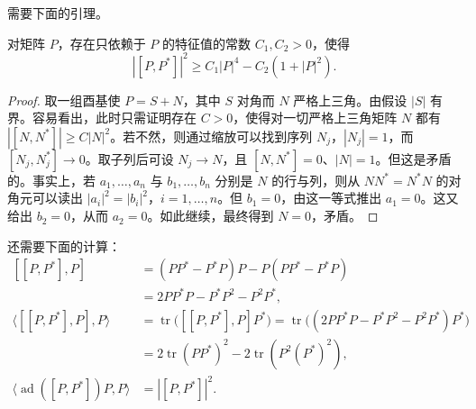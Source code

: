 需要下面的引理。

\begin{lemma}[参看 {[59, p. 27]}]
对矩阵 $P$，存在只依赖于 $P$ 的特征值的常数 $C_1,C_2>0$，使得
\[
|[P,P^*]|^2\ge C_1|P|^4-C_2(1+|P|^2).
\]
\end{lemma}

\begin{proof}
取一组酉基使 $P=S+N$，其中 $S$ 对角而 $N$ 严格上三角。由假设 $|S|$ 有界。容易看出，此时只需证明存在 $C>0$，使得对一切严格上三角矩阵 $N$ 都有 $|[N,N^*]|\ge C|N|^2$。若不然，则通过缩放可以找到序列 $N_j$，$|N_j|=1$，而 $[N_j,N_j^*]\to0$。取子列后可设 $N_j\to N$，且 $[N,N^*]=0$、$|N|=1$。但这是矛盾的。事实上，若 $a_1,\dots,a_n$ 与 $b_1,\dots,b_n$ 分别是 $N$ 的行与列，则从 $NN^*=N^*N$ 的对角元可以读出 $|a_i|^2=|b_i|^2$，$i=1,\dots,n$。但 $b_1=0$，由这一等式推出 $a_1=0$。这又给出 $b_2=0$，从而 $a_2=0$。如此继续，最终得到 $N=0$，矛盾。
\end{proof}

还需要下面的计算：
\begin{equation}
\begin{aligned}
[[P,P^*],P]&=(PP^*-P^*P)P-P(PP^*-P^*P)\\
&=2PP^*P-P^*P^2-P^2P^*,\\
\langle[[P,P^*],P],P\rangle&=\operatorname{tr}\bigl([[P,P^*],P]P^*\bigr)=\operatorname{tr}\bigl((2PP^*P-P^*P^2-P^2P^*)P^*\bigr)\\
&=2\operatorname{tr}(PP^*)^2-2\operatorname{tr}(P^2(P^*)^2),\\
\langle\operatorname{ad}([P,P^*])P,P\rangle&=|[P,P^*]|^2.
\end{aligned}
\label{eq:4.22}
\tag{4.22}
\end{equation}

